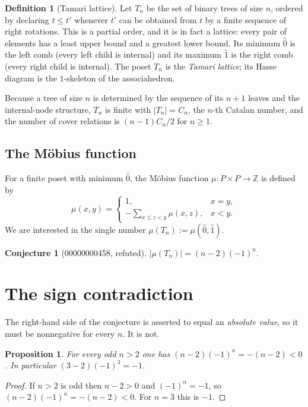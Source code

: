 \documentclass[11pt]{article}
\newtheorem{proposition}[theorem]{Proposition}
\theoremstyle{definition}
\newtheorem{definition}[theorem]{Definition}
\newtheorem{conjecture}[theorem]{Conjecture}
\begin{document}
\begin{definition}[Tamari lattice]
Let $T_n$ be the set of binary trees of size $n$, ordered by declaring
$t\le t'$ whenever $t'$ can be obtained from $t$ by a finite sequence of
right rotations. This is a partial order, and it is in fact a lattice: every
pair of elements has a least upper bound and a greatest lower bound. Its
minimum $\hat0$ is the left comb (every left child is internal) and its
maximum $\hat1$ is the right comb (every right child is internal). The
poset $T_n$ is the \emph{Tamari lattice}; its Hasse diagram is the
$1$-skeleton of the associahedron.
\end{definition}

Because a tree of size $n$ is determined by the sequence of its
$n+1$ leaves and the internal-node structure, $T_n$ is finite with
$|T_n|=C_n$, the $n$-th Catalan number, and the number of cover relations
is $(n-1)C_n/2$ for $n\ge 1$.

\subsection{The M\"obius function}

For a finite poset with minimum $\hat0$, the M\"obius function
$\mu:P\times P\to\mathbb Z$ is defined by
\[
\mu(x,y)=
\begin{cases}
1, & x=y,\\[2pt]
-\displaystyle\sum_{x\le z<y}\mu(x,z), & x<y.
\end{cases}
\]
We are interested in the single number
$\mu(T_n):=\mu(\hat0,\hat1)$.

\begin{conjecture}[00000000458, refuted]
$\bigl|\mu(T_n)\bigr|=(n-2)(-1)^n$.
\end{conjecture}

\section{The sign contradiction}

The right-hand side of the conjecture is asserted to equal an \emph{absolute
value}, so it must be nonnegative for every $n$. It is not.

\begin{proposition}\label{prop:sign}
For every odd $n>2$ one has $(n-2)(-1)^n=-(n-2)<0$. In particular
$(3-2)(-1)^3=-1$.
\end{proposition}

\begin{proof}
If $n>2$ is odd then $n-2>0$ and $(-1)^n=-1$, so
$(n-2)(-1)^n=-(n-2)<0$. For $n=3$ this is $-1$.
\end{proof}
\end{document}
